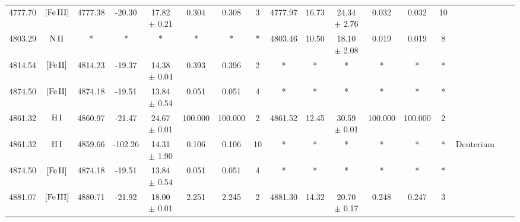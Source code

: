\documentclass[twocolumn]{aastex63}
\begin{document}
\begin{table}
{\begin{tabular}{@{}ccccccccccccccccc@{}}
4777.70 & $\mbox{[Fe}\thinspace \mbox{III]}$ & 4777.38 & -20.30 & 17.82 $\pm$ 0.21 & 0.304 & 0.308 & 3 & 4777.97 & 16.73 & 24.34 $\pm$ 2.76 & 0.032 & 0.032 & 10 &   \\
4803.29 & $\mbox{N}\thinspace \mbox{II}$ & * & * & * & * & * & * & 4803.46 & 10.50 & 18.10 $\pm$ 2.08 & 0.019 & 0.019 & 8 &  \\
4814.54 & $\mbox{[Fe}\thinspace \mbox{II]}$ & 4814.23 & -19.37 & 14.38 $\pm$ 0.04 & 0.393 & 0.396 & 2 & * & * & * & * & * & * &  \\
4874.50 & $\mbox{[Fe}\thinspace \mbox{II]}$ & 4874.18 & -19.51 & 13.84 $\pm$ 0.54 & 0.051 & 0.051 & 4 & * & * & * & * & * & * &  \\
4861.32 & $\mbox{H}\thinspace \mbox{I}$ & 4860.97 & -21.47 & 24.67 $\pm$ 0.01 & 100.000 & 100.000 & 2 & 4861.52 & 12.45 & 30.59 $\pm$ 0.01 & 100.000 & 100.000 & 2 &  \\
4861.32 & $\mbox{H}\thinspace \mbox{I}$ & 4859.66 & -102.26 & 14.31 $\pm$ 1.90 & 0.106 & 0.106 & 10 & * & * & * & * & * & * &  Deuterium \\
4874.50 & $\mbox{[Fe}\thinspace \mbox{II]}$ & 4874.18 & -19.51 & 13.84 $\pm$ 0.54 & 0.051 & 0.051 & 4 & * & * & * & * & * & * &  \\
4881.07 & $\mbox{[Fe}\thinspace \mbox{III]}$ & 4880.71 & -21.92 & 18.00 $\pm$ 0.01 & 2.251 & 2.245 & 2 & 4881.30 & 14.32 & 20.70 $\pm$ 0.17 & 0.248 & 0.247 & 3 &   \\
\hline
\end{tabular}%
    }
\end{table}
\end{document}
